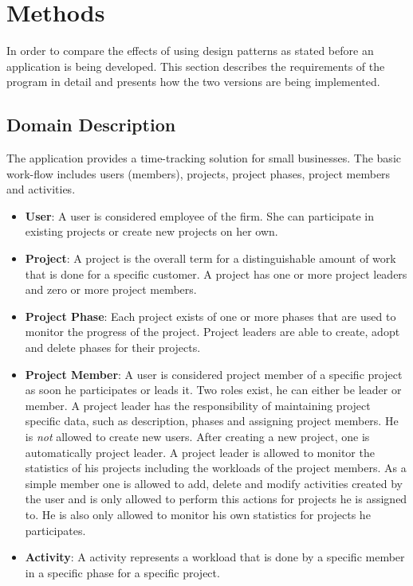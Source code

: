 \chapter{Methods}
In order to compare the effects of using design patterns as stated before an application is being developed. This section describes the requirements of the program in detail and presents how the two versions are being implemented.

\section{Domain Description}
The application provides a time-tracking solution for small businesses. The basic work-flow includes users (members), projects, project phases, project members and activities. 

\begin{itemize}
	\item \textbf{User}: A user is considered employee of the firm. She can participate in existing projects or create new projects on her own.
	\item \textbf{Project}: A project is the overall term for a distinguishable amount of work that is done for a specific customer. A project has one or more project leaders and zero or more project members.
	\item \textbf{Project Phase}: Each project exists of one or more phases that are used to monitor the progress of the project. Project leaders are able to create, adopt and delete phases for their projects. 
	\item \textbf{Project Member}: A user is considered project member of a specific project as soon he participates or leads it. Two roles exist, he can either be leader or member. A project leader has the responsibility of maintaining project specific data, such as description, phases and assigning project members. He is \emph{not} allowed to create new users. After creating a new project, one is automatically project leader. A project leader is allowed to monitor the statistics of his projects including the workloads of the project members. As a simple member one is allowed to add, delete and modify activities created by the user and is only allowed to perform this actions for projects he is assigned to. He is also only allowed to monitor his own statistics for projects he participates.
	\item \textbf{Activity}: A activity represents a workload that is done by a specific member in a specific phase for a specific project.
\end{itemize}

